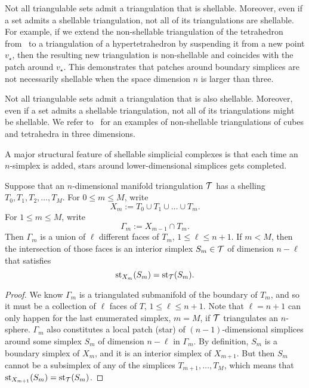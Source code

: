 \documentclass[10pt,a4paper]{article}
\begin{document}
\begin{remark}
    Not all triangulable sets admit a triangulation that is shellable. 
    Moreover, even if a set admits a shellable triangulation, not all of its triangulations are shellable. For example, if we extend the non-shellable triangulation of the tetrahedron from~\cite[Example 8.9]{ziegler1995lectures} to a triangulation of a hypertetrahedron by suspending it from a new point $v_\star$, then the resulting new triangulation is non-shellable and coincides with the patch around $v_\star$.
    This demonstrates that patches around boundary simplices are not necessarily shellable when the space dimension $n$ is larger than three.
\end{remark}
\begin{remark}
    Not all triangulable sets admit a triangulation that is also shellable. 
    Moreover, even if a set admits a shellable triangulation, not all of its triangulations might be shellable. 
    We refer to~\cite[Example 8.9]{ziegler1995lectures} for an examples of non-shellable triangulations of cubes and tetrahedra in three dimensions. 
\end{remark}


A major structural feature of shellable simplicial complexes is that each time an $n$-simplex is added, stars around lower-dimensional simplices gets completed. 

\begin{lemma}\label{lemma:existenceofstar}
    Suppose that an $n$-dimensional manifold triangulation ${\mathcal T}$ has a shelling $T_{0}, T_{1}, T_{2}, \dots, T_{M}$.
    For $0 \leq m \leq M$, write 
    $$
        X_{m} := T_{0} \cup T_{1} \cup \dots \cup T_{m}.
    $$ 
    For $1 \leq m \leq M$, write 
    $$
        \Gamma_{m} := X_{m-1} \cap T_{m}.
    $$ 
    Then $\Gamma_{m}$ is a union of $\ell$ different faces of $T_{m}$, $1 \leq \ell \leq n+1$.
    If $m < M$, then the intersection of those faces is an interior simplex $S_{m} \in {\mathcal T}$ of dimension $n-\ell$ that satisfies 
    $$
        \operatorname{st}_{X_{m}}(S_{m}) = \operatorname{st}_{{\mathcal T}}(S_{m}).
    $$
\end{lemma}
\begin{proof}
    We know $\Gamma_{m}$ is a triangulated submanifold of the boundary of $T_{m}$, 
    and so it must be a collection of $\ell$ faces of $T$, $1 \leq \ell \leq n+1$.
    Note that $\ell = n + 1$ can only happen for the last enumerated simplex, $m = M$, if ${\mathcal T}$ triangulates an $n$-sphere. 
    $\Gamma_{m}$ also constitutes a local patch (star) of $(n-1)$-dimensional simplices around some simplex $S_{m}$ of dimension $n-\ell$ in $\Gamma_{m}$.
    By definition, $S_{m}$ is a boundary simplex of $X_{m}$, 
    and it is an interior simplex of $X_{m+1}$. 
    But then $S_{m}$ cannot be a subsimplex of any of the simplices $T_{m+1}, \dots, T_{M}$,
    which means that $\operatorname{st}_{X_{m+1}}(S_{m}) = \operatorname{st}_{{\mathcal T}}(S_{m})$. 
\end{proof}
\end{document}
